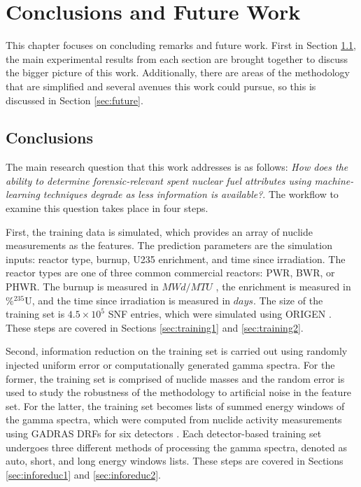 \chapter{Conclusions and Future Work}
\label{ch:concl}

This chapter focuses on concluding remarks and future work.  First in Section
\ref{sec:concl}, the main experimental results from each section are brought
together to discuss the bigger picture of this work.  Additionally, there are
areas of the methodology that are simplified and several avenues this work
could pursue, so this is discussed in Section \ref{sec:future}.

\section{Conclusions}
\label{sec:concl}

The main research question that this work addresses is as follows: \textit{How
does the ability to determine forensic-relevant spent nuclear fuel attributes
using machine-learning techniques degrade as less information is available?}. 
The workflow to examine this question takes place in four steps.  

First, the training data is simulated, which provides an array of nuclide
measurements as the features. The prediction parameters are the simulation
inputs: reactor type, burnup, \gls{U235} enrichment, and time since
irradiation.  The reactor types are one of three common commercial reactors:
\gls{PWR}, \gls{BWR}, or \gls{PHWR}.  The burnup is measured in $MWd/MTU$ , the
enrichment is measured in $\%{}^{235}\text{U}$, and the time since irradiation
is measured in $days$. The size of the training set is $4.5 \times 10^5$
\gls{SNF} entries, which were simulated using \gls{ORIGEN} \cite{scale, origen,
origenarp}.  These steps are covered in Sections \ref{sec:training1} and
\ref{sec:training2}.

Second, information reduction on the training set is carried out using randomly
injected uniform error or computationally generated gamma spectra. For the
former, the training set is comprised of nuclide masses and the random error is
used to study the robustness of the methodology to artificial noise in the
feature set.  For the latter, the training set becomes lists of summed energy
windows of the gamma spectra, which were computed from nuclide activity
measurements using \gls{GADRAS} \gls{DRF}s for six detectors \cite{gadras}.
Each detector-based training set undergoes three different methods of
processing the gamma spectra, denoted as auto, short, and long energy windows
lists.  These steps are covered in Sections \ref{sec:inforeduc1} and
\ref{sec:inforeduc2}.


